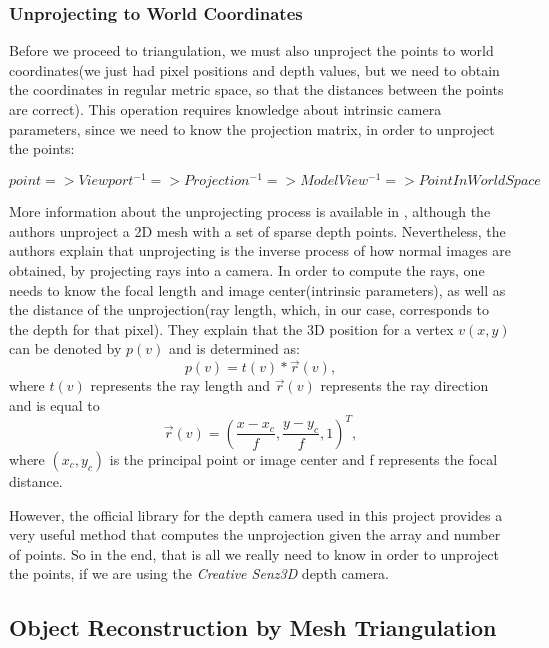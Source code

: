 \documentclass[]{article}
\begin{document}
\subsubsection{Unprojecting to World Coordinates}
\label{sec:unprojecting}

 Before we proceed to triangulation, we must also unproject the points to world coordinates(we just had pixel positions and depth values, but we need to obtain the coordinates in regular metric space, so that the distances between the points are correct). This operation requires knowledge about intrinsic camera parameters, since we need to know the projection matrix, in order to unproject the points:

$$point => Viewport^{-1} => Projection^{-1} => ModelView^{-1} => PointInWorldSpace$$

More information about the unprojecting process is available in \cite{sung2013}, although the authors unproject a 2D mesh with a set of sparse depth points. Nevertheless, the authors explain that unprojecting is the inverse process of how normal images are obtained, by projecting rays into a camera. In order to compute the rays, one needs to know the focal length and image center(intrinsic parameters), as well as the distance of the unprojection(ray length, which, in our case, corresponds to the depth for that pixel). They explain that the 3D position for a vertex $v(x,y)$ can be denoted by $p(v)$ and is determined as:
$$p(v) = t(v) *\vec{r}(v),$$
where $t(v)$ represents the ray length and $\vec{r}(v)$ represents the ray direction and is equal to $$\vec{r}(v) = (\frac{x - x_{c}}{f},\frac{y-y_{c}}{f},1)^T,$$ where $(x_{c}, y_{c})$ is the principal point or image center and f represents the focal distance.

However, the official library for the depth camera used in this project provides a very useful method that computes the unprojection given the array and number of points. So in the end, that is all we really need to know in order to unproject the points, if we are using the \textit{Creative Senz3D} depth camera.
 
\subsection{Object Reconstruction by Mesh Triangulation}
\end{document}
